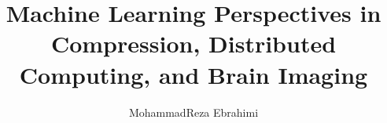 \documentclass{ut-thesis}
\author{MohammadReza Ebrahimi}
\title{Machine Learning Perspectives in Compression, Distributed Computing, and Brain Imaging}
\begin{document}
  \frontmatter
    
    \maketitle
    
    \begin{abstract}
      
    \end{abstract}
    
    \begin{dedication}
      
    \end{dedication}
    
    \begin{acknowledgements}
      
    \end{acknowledgements}
    
    \tableofcontents
    \listoftables
    \listoffigures

  \mainmatter
    
    
    
    
    
  
  
  \backmatter
  \printbibliography[heading=bibintoc]
  
\end{document}

